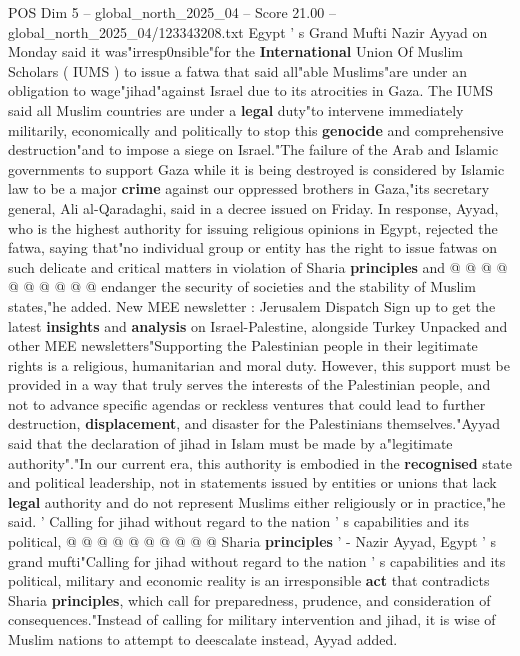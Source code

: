 \begin{textsample}{POS Dim 5 – global\_north\_2025\_04 – Score 21.00 – global\_north\_2025\_04/123343208.txt}  \label{ex:f5_pos_101}
Egypt ' s Grand Mufti Nazir Ayyad on Monday said it was"irresp0nsible"for the \textbf{International} Union Of Muslim Scholars ( IUMS ) to issue a fatwa that said all"able Muslims"are under an obligation to wage"jihad"against Israel due to its atrocities in Gaza.
The IUMS said all Muslim countries are under a \textbf{legal} duty"to intervene immediately militarily, economically and politically to stop this \textbf{genocide} and comprehensive destruction"and to impose a siege on Israel."The failure of the Arab and Islamic governments to support Gaza while it is being destroyed is considered by Islamic law to be a major \textbf{crime} against our oppressed brothers in Gaza,"its secretary general, Ali al-Qaradaghi, said in a decree issued on Friday.
In response, Ayyad, who is the highest authority for issuing religious opinions in Egypt, rejected the fatwa, saying that"no individual group or entity has the right to issue fatwas on such delicate and critical matters in violation of Sharia \textbf{principles} and @ @ @ @ @ @ @ @ @ @ endanger the security of societies and the stability of Muslim states,"he added.
New MEE newsletter : Jerusalem Dispatch Sign up to get the latest \textbf{insights} and \textbf{analysis} on Israel-Palestine, alongside Turkey Unpacked and other MEE newsletters"Supporting the Palestinian people in their legitimate rights is a religious, humanitarian and moral duty.
However, this support must be provided in a way that truly serves the interests of the Palestinian people, and not to advance specific agendas or reckless ventures that could lead to further destruction, \textbf{displacement}, and disaster for the Palestinians themselves."Ayyad said that the declaration of jihad in Islam must be made by a"legitimate authority"."In our current era, this authority is embodied in the \textbf{recognised} state and political leadership, not in statements issued by entities or unions that lack \textbf{legal} authority and do not represent Muslims either religiously or in practice,"he said. ' Calling for jihad without regard to the nation ' s capabilities and its political, @ @ @ @ @ @ @ @ @ @ Sharia \textbf{principles} ' - Nazir Ayyad, Egypt ' s grand mufti"Calling for jihad without regard to the nation ' s capabilities and its political, military and economic reality is an irresponsible \textbf{act} that contradicts Sharia \textbf{principles}, which call for preparedness, prudence, and consideration of consequences."Instead of calling for military intervention and jihad, it is wise of Muslim nations to attempt to deescalate instead, Ayyad added.

\end{textsample}
